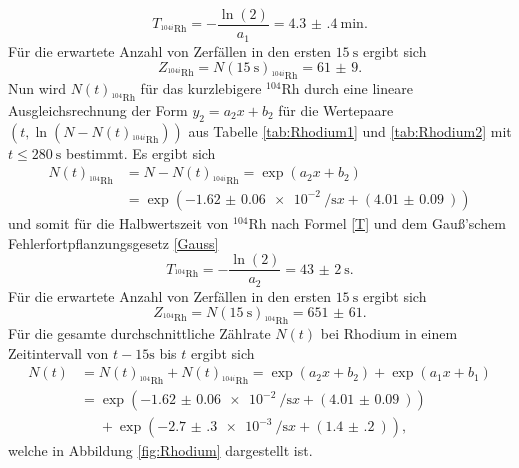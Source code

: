\begin{displaymath}
	T_{^{104i}\text{Rh}} = -\frac{\ln(2)}{a_1}=\SI{4.3(4)}{\minute}\text{.}
\end{displaymath}
Für die erwartete Anzahl von Zerfällen in den ersten $\SI{15}{\second}$ ergibt sich
\begin{displaymath}
	Z_{^{104i}\text{Rh}} = N(\SI{15}{\second})_{^{104i}\text{Rh}}=\num{61(9)}\text{.}
\end{displaymath}
Nun wird $N(t)_{^{104}\text{Rh}}$ für das kurzlebigere $^{104}\text{Rh}$ durch eine lineare Ausgleichsrechnung der Form $y_2=a_2 x+b_2$ für die Wertepaare $(t,\ln(N-N(t)_{^{104i}\text{Rh}}))$ aus Tabelle \ref{tab:Rhodium1} und \ref{tab:Rhodium2}  mit $t\le \SI{280}{\second}$ bestimmt.
Es ergibt sich
\begin{align*}
N(t)_{^{104}\text{Rh}} &= N-N(t)_{^{104i}\text{Rh}} = \exp\left(a_2 x + b_2\right) \\
 &= \exp\left(-\SI{1.62(6)e-2}{\per\second} x + (\SI{4.01(9)}{})\right)
\end{align*}
und somit für die Halbwertszeit von $^{104}\text{Rh}$ nach Formel \eqref{T} und dem Gauß'schem Fehlerfortpflanzungsgesetz \eqref{Gauss}
\begin{displaymath}
T_{^{104}\text{Rh}} = -\frac{\ln(2)}{a_2}=\SI{43(2)}{\second}\text{.}
\end{displaymath}
Für die erwartete Anzahl von Zerfällen in den ersten $\SI{15}{\second}$ ergibt sich
\begin{displaymath}
Z_{^{104}\text{Rh}} = N(\SI{15}{\second})_{^{104}\text{Rh}}=\num{651(61)}\text{.}
\end{displaymath}
Für die gesamte durchschnittliche Zählrate $N(t)$ bei Rhodium in einem Zeitintervall von $t-15\si{\second}$ bis $t$ ergibt sich
\begin{align*}
N(t)&=N(t)_{^{104}\text{Rh}}+N(t)_{^{104i}\text{Rh}} =  \exp\left(a_2 x + b_2\right)+\exp\left(a_1 x + b_1\right) \\
&= \exp\left(-\SI{1.62(6)e-2}{\per\second} x + (\SI{4.01(9)}{})\right) \\
&\phantom{=}+\exp\left(-\SI{2.7(3)e-3}{\per\second} x + (\SI{1.4(2)}{})\right)\text{,}
\end{align*}
welche in Abbildung \ref{fig:Rhodium} dargestellt ist.

